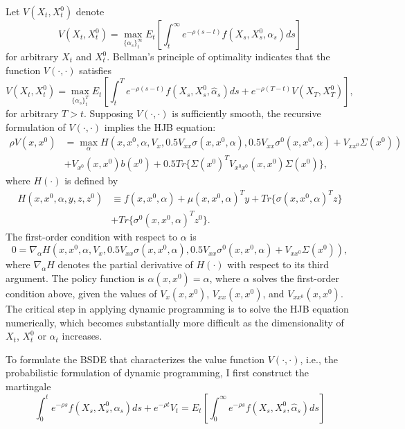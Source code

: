 \documentclass{article}
\begin{document}
Let $V(X_{t},X_{t}^{0})$ denote
\[
V(X_{t},X_{t}^{0})=\max_{\{\alpha_{s}\}_{t}^{\infty}}E_{t}\left[\int_{t}^{\infty}e^{-\rho(s-t)}f(X_{s},X_{s}^{0},\alpha_{s})ds\right]
\]
for arbitrary $X_{t}$ and $X_{t}^{0}$. Bellman's principle of optimality indicates that the function $V(\cdot,\cdot)$ satisfies
\[
V(X_{t},X_{t}^{0})=\max_{\{\alpha_{s}\}_{t}^{T}}E_{t}\left[\int_{t}^{T}e^{-\rho(s-t)}f(X_{s},X_{s}^{0},\hat{\alpha}_{s})ds+e^{-\rho(T-t)}V(X_{T},X_{T}^{0})\right],
\]
for arbitrary $T>t$. Supposing $V(\cdot,\cdot)$ is sufficiently smooth, the recursive formulation of $V(\cdot,\cdot)$ implies the HJB equation:
\begin{align*}
\rho V(x,x^{0})&=\max_{\alpha}H(x,x^{0},\alpha,V_{x},0.5V_{xx}\sigma(x,x^{0},\alpha),0.5V_{xx}\sigma^{0}(x,x^{0},\alpha)+V_{xx^{0}}\Sigma(x^{0})) \\
&+V_{x^{0}}(x,x^{0})b(x^{0})+0.5Tr\{\Sigma(x^{0})^{T}V_{x^{0}x^{0}}(x,x^{0})\Sigma(x^{0})\},
\end{align*}
where $H(\cdot)$ is defined by
\begin{align*}
H(x,x^{0},\alpha,y,z,z^{0})&\equiv f(x,x^{0},\alpha)+\mu(x,x^{0},\alpha)^{T}y+Tr\{\sigma(x,x^{0},\alpha)^{T}z\} \\
&+Tr\{\sigma^{0}(x,x^{0},\alpha)^{T}z^{0}\}.
\end{align*}
The first-order condition with respect to $\alpha$ is
\begin{equation}
0=\nabla_{\alpha}H(x,x^{0},\alpha,V_{x},0.5V_{xx}\sigma(x,x^{0},\alpha),0.5V_{xx}\sigma^{0}(x,x^{0},\alpha)+V_{xx^{0}}\Sigma(x^{0})),
\label{eq:28}
\end{equation}
where $\nabla_{\alpha}H$ denotes the partial derivative of $H(\cdot)$ with respect to its third argument. The policy function is $\alpha(x,x^{0})=\hat{\alpha}$, where $\hat{\alpha}$ solves the first-order condition above, given the values of $V_{x}(x,x^{0})$, $V_{xx}(x,x^{0})$, and $V_{xx^{0}}(x,x^{0})$. The critical step in applying dynamic programming is to solve the HJB equation numerically, which becomes substantially more difficult as the dimensionality of $X_{t}$, $X_{t}^{0}$ or $\alpha_{t}$ increases.

To formulate the BSDE that characterizes the value function $V(\cdot,\cdot)$, i.e., the probabilistic formulation of dynamic programming, I first construct the martingale
\[
\int_{0}^{t}e^{-\rho s}f(X_{s},X_{s}^{0},\hat{\alpha}_{s})ds+e^{-\rho t}V_{t}=E_{t}\left[\int_{0}^{\infty}e^{-\rho s}f(X_{s},X_{s}^{0},\hat{\alpha}_{s})ds\right]
\]

\clearpage
\end{document}
